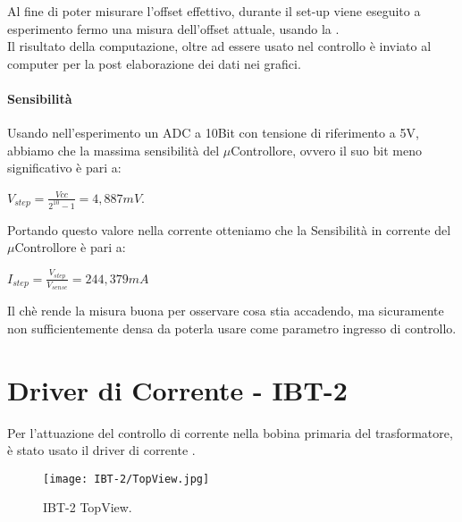 Al fine di poter misurare l'offset effettivo, durante il set-up viene eseguito a esperimento fermo una misura dell'offset attuale, usando la .\\
Il risultato della computazione, oltre ad essere usato nel controllo è inviato al computer per la post elaborazione dei dati nei grafici.

\paragraph{Sensibilità}
Usando nell'esperimento un ADC a 10Bit con tensione di riferimento a 5V, abbiamo che la massima sensibilità del $\mu$Controllore, ovvero il suo bit meno significativo è pari a:\\

{\large\begin{center}
	$V_{step}=\frac{Vcc}{2^{10}-1} = 4,887mV$.\\
	
\end{center}}
Portando questo valore nella corrente otteniamo che la Sensibilità in corrente del $\mu$Controllore è pari a:\\

{\LARGE
\begin{center}
	$I_{step} =\frac{ V_{step}}{V_{sense}} = 244,379 mA$
\end{center}
}

Il chè rende la misura buona per osservare cosa stia accadendo, ma sicuramente non sufficientemente densa da poterla usare come parametro ingresso di controllo.

\newpage

\section{Driver di Corrente - IBT-2}\label{CurrentDriver}
Per l'attuazione del controllo di corrente nella bobina primaria del trasformatore, è stato usato il driver di corrente \cite{IBT-2} .

\begin{figure}[h]
	\centering
	\texttt{[image: IBT-2/TopView.jpg]}
	\caption[Driver Motori IBT-2 TopView \& PinOut]{IBT-2 TopView.}
\end{figure}

